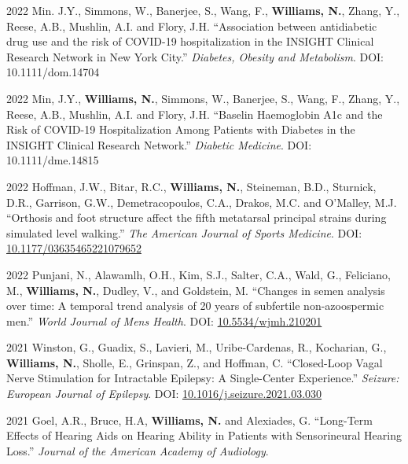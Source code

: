 \documentclass[12pt,letterpaper]{report}
\begin{document}
\begin{tablist}
    \item[2022] \tab Min. J.Y., Simmons, W., Banerjee, S., Wang, F., \textbf{Williams, N.}, Zhang, Y., Reese, A.B., Mushlin, A.I. and Flory, J.H. \enquote{Association between antidiabetic drug use and the risk of COVID-19 hospitalization in the INSIGHT Clinical Research Network in New York City.} \textit{Diabetes, Obesity and Metabolism}. DOI: 10.1111/dom.14704
    
    \item[2022] \tab Min, J.Y., \textbf{Williams, N.}, Simmons, W., Banerjee, S., Wang, F., Zhang, Y., Reese, A.B., Mushlin, A.I. and Flory, J.H. \enquote{Baselin Haemoglobin A1c and the Risk of COVID-19 Hospitalization Among Patients with Diabetes in the INSIGHT Clinical Research Network.} \textit{Diabetic Medicine}. DOI: 10.1111/dme.14815 
    
    \item[2022] \tab Hoffman, J.W., Bitar, R.C., \textbf{Williams, N.}, Steineman, B.D., Sturnick, D.R., Garrison, G.W., Demetracopoulos, C.A., Drakos, M.C. and O'Malley, M.J. \enquote{Orthosis and foot structure affect the fifth metatarsal principal strains during simulated level walking.} \textit{The American Journal of Sports Medicine}. DOI: \href{https://doi.org/10.1177/03635465221079652}{10.1177/03635465221079652}
    
    \item[2022] \tab Punjani, N., Alawamlh, O.H., Kim, S.J., Salter, C.A., Wald, G., Feliciano, M., \textbf{Williams, N.}, Dudley, V., and Goldstein, M. \enquote{Changes in semen analysis over time: A temporal trend analysis of 20 years of subfertile non-azoospermic men.} \textit{World Journal of Mens Health}. DOI: \href{https://doi.org/10.5534/wjmh.210201}{10.5534/wjmh.210201}
    
     \item[2021] \tab Winston, G., Guadix, S., Lavieri, M., Uribe-Cardenas, R., Kocharian, G., \textbf{Williams, N.}, Sholle, E., Grinspan, Z., and Hoffman, C. \enquote{Closed-Loop Vagal Nerve Stimulation for Intractable Epilepsy: A Single-Center Experience.} \textit{Seizure: European Journal of Epilepsy}. DOI: \href{https://doi.org/10.1016/j.seizure.2021.03.030}{10.1016/j.seizure.2021.03.030}
    
    \item[2021] \tab Goel, A.R., Bruce, H.A, \textbf{Williams, N.} and Alexiades, G. \enquote{Long-Term Effects of Hearing Aids on Hearing Ability in Patients with Sensorineural Hearing Loss.} \textit{Journal of the American Academy of Audiology}.
    

\end{tablist}
\end{document}
